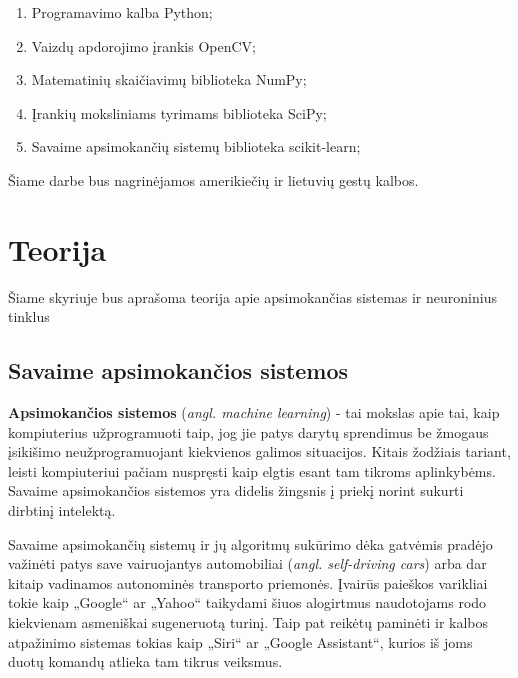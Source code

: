 \documentclass{VUMIFInfKursinis}
\begin{document}

\begin{enumerate}
	\item Programavimo kalba Python;
	\item Vaizdų apdorojimo įrankis OpenCV;
	\item Matematinių skaičiavimų biblioteka NumPy;
	\item Įrankių moksliniams tyrimams biblioteka SciPy;
	\item Savaime apsimokančių sistemų biblioteka scikit-learn;
\end{enumerate}

Šiame darbe bus nagrinėjamos amerikiečių ir lietuvių gestų kalbos.

\section{Teorija}
Šiame skyriuje bus aprašoma teorija apie apsimokančias sistemas ir neuroninius tinklus

\subsection{Savaime apsimokančios sistemos}
\textbf{Apsimokančios sistemos} (\textit{angl. machine learning}) - tai mokslas apie tai, kaip kompiuterius užprogramuoti taip, jog jie patys darytų sprendimus be žmogaus įsikišimo neužprogramuojant kiekvienos galimos situacijos. Kitais žodžiais tariant, leisti kompiuteriui pačiam nuspręsti kaip elgtis esant tam tikroms aplinkybėms. Savaime apsimokančios sistemos yra didelis žingsnis į priekį norint sukurti dirbtinį intelektą.

Savaime apsimokančių sistemų ir jų algoritmų sukūrimo dėka gatvėmis pradėjo važinėti patys save vairuojantys automobiliai (\textit{angl. self-driving cars}) arba dar kitaip vadinamos autonominės transporto priemonės. Įvairūs paieškos varikliai tokie kaip „Google“ ar „Yahoo“ taikydami šiuos alogirtmus naudotojams rodo kiekvienam asmeniškai sugeneruotą turinį. Taip pat reikėtų paminėti ir kalbos atpažinimo sistemas tokias kaip „Siri“ ar „Google Assistant“, kurios iš joms duotų komandų atlieka tam tikrus veiksmus.
\end{document}
